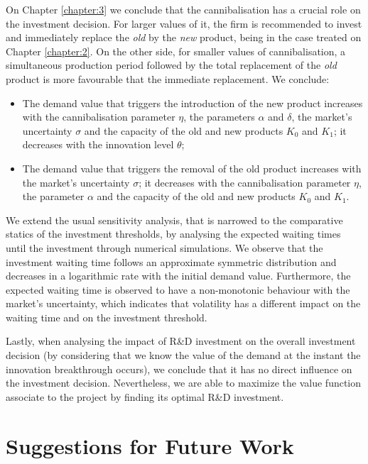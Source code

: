 On Chapter \ref{chapter:3} we conclude that the cannibalisation has a crucial role on the investment decision. For larger values of it, the firm is recommended to invest and immediately replace the \textit{old} by the \textit{new} product, being in the case treated on Chapter \ref{chapter:2}. On the other side, for smaller values of cannibalisation, a simultaneous production period followed by the total replacement of the \textit{old} product is more favourable that the immediate replacement. We conclude:
\begin{itemize}
	\item The demand value that triggers the introduction of the new product increases with the cannibalisation parameter $\eta$, the parameters $\alpha$ and $\delta$, the market's uncertainty $\sigma$ and the capacity of the old and new products $K_0$ and $K_1$; it decreases with the innovation level $\theta$;
	\item The demand value that triggers the removal of the old product increases with the market's uncertainty $\sigma$; it decreases with the cannibalisation parameter $\eta$, the parameter $\alpha$ and the capacity of the old and new products $K_0$ and $K_1$.
\end{itemize}
  
We extend the usual sensitivity analysis, that is narrowed to the comparative statics of the investment thresholds, by analysing the expected waiting times until the investment through numerical simulations. We observe that the investment waiting time follows an approximate symmetric distribution and decreases in a logarithmic rate with the initial demand value. Furthermore, the expected waiting time is observed to have a non-monotonic behaviour with the market's uncertainty, which indicates that volatility has a different impact on the waiting time and on the investment threshold.

Lastly, when analysing the impact of R\&D investment on the overall investment decision (by considering that we know the value of the demand at the instant the innovation breakthrough occurs), we conclude that it has no direct influence on the investment decision. Nevertheless, we are able to maximize the value function associate to the project by finding its optimal R\&D investment.

\section{Suggestions for Future Work}
\label{section:future}

